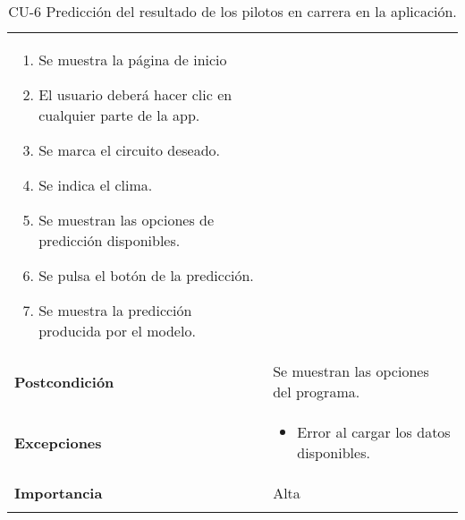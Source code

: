 \begin{longtable}[h!]{@{}ll@{}}
\begin{minipage}[t]{0.71\columnwidth}
\begin{enumerate}
\def\labelenumi{\arabic{enumi}.}
\tightlist
\item 
  Se muestra la página de inicio
\item
  El usuario deberá hacer clic en cualquier parte de la app.  
\item
  Se marca el circuito deseado.
\item
  Se indica el clima.
\item
  Se muestran las opciones de predicción disponibles.
\item
  Se pulsa el botón de la predicción.
\item
  Se muestra la predicción producida por el modelo.
\end{enumerate}\strut
\end{minipage}\tabularnewline
\begin{minipage}[t]{0.23\columnwidth}\raggedright\strut
\textbf{Postcondición}\strut
\end{minipage} & \begin{minipage}[t]{0.71\columnwidth}\raggedright\strut
Se muestran las opciones del programa.\strut
\end{minipage}\tabularnewline
\begin{minipage}[t]{0.23\columnwidth}\raggedright\strut
\textbf{Excepciones}\strut
\end{minipage} & \begin{minipage}[t]{0.71\columnwidth}\raggedright\strut
\begin{itemize}
\tightlist
\item
  Error al cargar los datos disponibles.
\end{itemize}\strut
\end{minipage}\tabularnewline
\begin{minipage}[t]{0.23\columnwidth}\raggedright\strut
\textbf{Importancia}\strut
\end{minipage} & \begin{minipage}[t]{0.71\columnwidth}\raggedright\strut
Alta\strut
\end{minipage}\tabularnewline
\bottomrule
\caption{CU-6 Predicción del resultado de los pilotos en carrera en la aplicación.}
\end{longtable}


